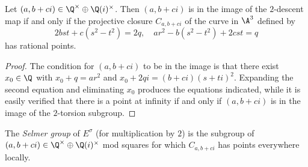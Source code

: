 \documentclass[12pt]{amsart}
\begin{document}
\begin{lem}\label{lem:cover}
Let $(a,b+ci) \in \Q^\times \oplus \Q(i)^\times$.  Then $(a,b+ci)$ is in the image of the $2$-descent map
if and only if the projective closure $C_{a,b+ci}$ of the curve in $\A^3$ defined by
$$2bst+c(s^2-t^2) = 2q, \quad ar^2-b(s^2-t^2)+2cst = q$$
has rational points.
\end{lem}

\begin{proof}
The condition for $(a,b+ci)$ to be in the image is that there exist $x_0 \in \Q$ with
$x_0+q = ar^2$ and $x_0+2qi = (b+ci)(s+ti)^2$.  Expanding the second equation and eliminating
$x_0$ produces the equations indicated, while it is easily verified that there is a point at
infinity if and only if $(a,b+ci)$ is in the image of the $2$-torsion subgroup.
\end{proof}

\begin{dfn}\label{def:selmer}
The {\em Selmer group} of $E^\sigma$ (for multiplication by $2$) is the subgroup of
$(a,b+ci) \in \Q^\times \oplus \Q(i)^\times$ mod squares
for which $C_{a,b+ci}$ has points everywhere locally.
\end{dfn}
\end{document}
